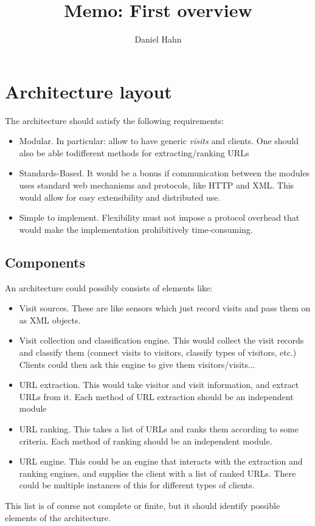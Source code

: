 \documentclass[a4paper]{danarticle}
\begin{document}
  \author{Daniel Hahn}
  \title{Memo: First overview}
  \maketitle
  
  \section*{Architecture layout}
    The architecture should satisfy the following requirements:
    \begin{itemize}
      \item{Modular. In particular: allow to have generic \textit{visits} 
            and clients. One should also be able todifferent methods 
	    for extracting/ranking URLs}
      \item{Standards-Based. It would be a bonus if communication between 
            the modules uses standard web mechanisms and protocols, like
	    HTTP and XML. This would allow for easy extensibility and
	    distributed use.}
      \item{Simple to implement. Flexibility must not impose a protocol
            overhead that would make the implementation prohibitively
	    time-consuming.}
    \end{itemize}
    \subsection*{Components}
      An architecture could possibly consists of elements like:
      \begin{itemize}
        \item{Visit sources. These are like sensors which just record visits
	      and pass them on as XML objects.}
	\item{Visit collection and classification engine. This would collect 
	      the visit records and classify them (connect visits to visitors,
	      classify types of visitors, etc.) Clients could then ask this
	      engine to give them visitors/visits...}
	\item{URL extraction. This would take visitor and visit information, and
	      extract URLs from it. Each method of URL extraction should be an
	      independent module}
	\item{URL ranking. This takes a list of URLs and ranks them according
	      to some criteria. Each method of ranking should be an independent
	      module.}
	\item{URL engine. This could be an engine that interacts with the
	      extraction and ranking engines, and supplies the client with
	      a list of ranked URLs. There could be multiple instances of this
	      for different types of clients.}
      \end{itemize}
      This list is of course not complete or finite, but it should identify
      possible elements of the architecture.
\end{document}
